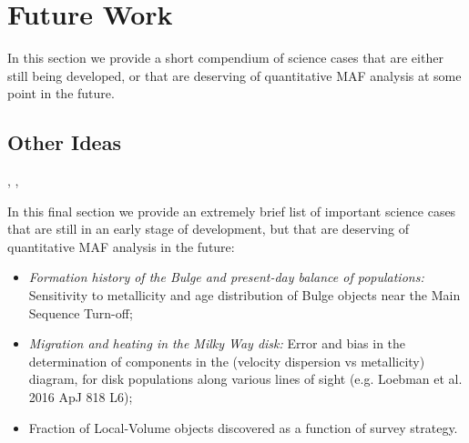 %
%

\section{Future Work}
\def\secname{MW_future}\label{sec:\secname}

In this section we provide a short compendium of science cases that
are either still being developed, or that are deserving of quantitative
MAF analysis at some point in the future.





\subsection{Other Ideas}

, , 

In this final section we provide an extremely brief list of important science
cases that are still in an early stage of development, but that are
deserving of quantitative MAF analysis in the future:

\begin{itemize}
  \item {\it Formation history of the Bulge and present-day balance of
  populations:} Sensitivity to metallicity and age distribution of Bulge
  objects near the Main Sequence Turn-off;
  \item {\it Migration and heating in the Milky Way disk:} Error and
  bias in the determination of components in the (velocity dispersion vs
  metallicity) diagram, for disk populations along various lines of
  sight (e.g. Loebman et al. 2016 ApJ 818 L6);
  \item Fraction of Local-Volume objects discovered as a function of
  survey strategy.
\end{itemize}


\navigationbar
